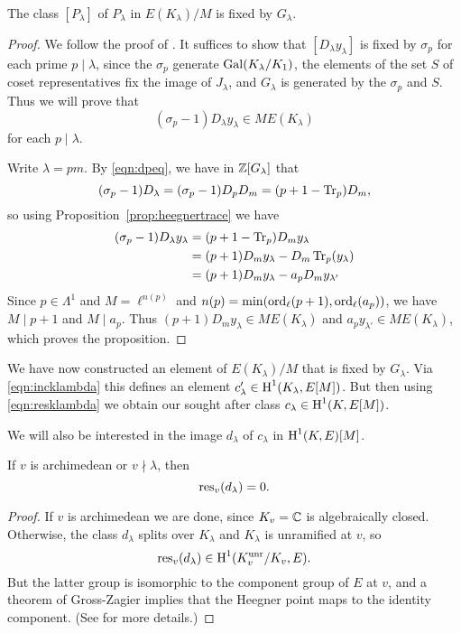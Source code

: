 \begin{proposition}\label{prop:pointfixed}
The class $[P_\lambda]$ of $P_\lambda$
in $E(K_{\lambda})/M$ is fixed by $G_\lambda$.
\end{proposition}
\begin{proof}
We follow the proof of \cite[Prop.~3.6]{gross:kolyvagin}.
It suffices to show that $[D_\lambda y_\lambda]$ is fixed
by $\sigma_p$ for each prime $p\mid \lambda$, since the $\sigma_p$
generate $\operatorname{Gal}(K_{\lambda}/K_1)$, the elements of the set $S$
of coset representatives fix the image 
of $J_{\lambda}$, and $G_\lambda$ is generated
by the $\sigma_p$ and $S$.
Thus we will prove that
$$
  (\sigma_p - 1) D_\lambda y_\lambda \in M E(K_{\lambda})
$$
for each $p\mid \lambda$.

Write $\lambda = p m$.  By \eqref{eqn:dpeq}, we have  in $\mathbb{Z}[G_{\lambda}]$
that
$$
  (\sigma_p - 1) D_\lambda = (\sigma_p - 1) D_p D_m = (p + 1 - \operatorname{Tr}_p) D_m,
$$
so using Proposition~\ref{prop:heegnertrace} we have
\begin{align*}
  (\sigma_p - 1) D_\lambda y_\lambda 
  &= (p + 1 - \operatorname{Tr}_p) D_m y_\lambda \\
  &= (p+1) D_m y_\lambda - D_m \operatorname{Tr}_p(y_\lambda)\\
  &= (p+1) D_m y_\lambda - a_p D_m y_{\lambda'}\\
\end{align*}
Since $p\in\Lambda^1$ and $M=\ell^{n(p)}$ and
$n(p) = \min(\operatorname{ord}_\ell(p+1), \operatorname{ord}_\ell(a_p))$, 
we have $M \mid p+1$ and $M\mid a_p$.
Thus $(p+1) D_m y_\lambda \in M E(K_{\lambda})$
and $a_p y_{\lambda'} \in M E(K_{\lambda})$, which
proves the proposition.
\end{proof}


We have now constructed an element of $E(K_\lambda)/M$ 
that is fixed by $G_{\lambda}$.  Via \eqref{eqn:incklambda}
this defines an element $c'_{\lambda} \in \operatorname{H}^1(K_{\lambda}, E[M])$.  
But then using \eqref{eqn:resklambda} we obtain our
sought after class $c_{\lambda} \in \operatorname{H}^1(K, E[M])$.


We will also be interested in the image $d_{\lambda}$
of $c_{\lambda}$ in $\operatorname{H}^1(K,E)[M]$.

\begin{proposition}
If $v$ is archimedean or $v\nmid \lambda$, then 
$$
  \operatorname{res}_v(d_{\lambda}) = 0.
$$
\end{proposition}
\begin{proof}
If $v$ is archimedean we are done, since $K_v = \mathbb{C}$
is algebraically closed.
Otherwise, the class $d_{\lambda}$ splits over $K_{\lambda}$
and $K_{\lambda}$ is unramified at $v$, so
$$
  \operatorname{res}_v(d_\lambda) \in \operatorname{H}^1(K_v^{\operatorname{unr}}/K_v, E).
$$
But the latter group is isomorphic to the component
group of $E$ at $v$, and a theorem of Gross-Zagier
implies that the Heegner point maps to the identity
component.  (See \cite[Prop.~6.2]{gross:kolyvagin} for
more details.)
\end{proof}

